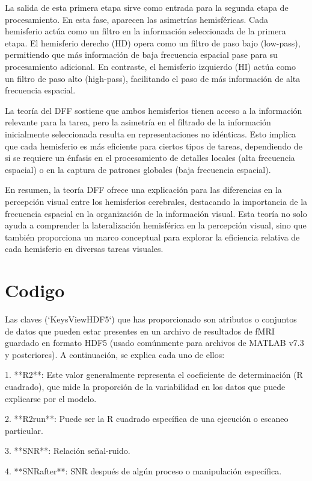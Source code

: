 \documentclass[12pt,oneside]{uhthesis}
\begin{document}
La salida de esta primera etapa sirve como entrada para la segunda etapa de procesamiento. En esta fase, aparecen las asimetrías hemisféricas. Cada hemisferio actúa como un filtro en la información seleccionada de la primera etapa. El hemisferio derecho (HD) opera como un filtro de paso bajo (low-pass), permitiendo que más información de baja frecuencia espacial pase para su procesamiento adicional. En contraste, el hemisferio izquierdo (HI) actúa como un filtro de paso alto (high-pass), facilitando el paso de más información de alta frecuencia espacial.

La teoría del DFF sostiene que ambos hemisferios tienen acceso a la información relevante para la tarea, pero la asimetría en el filtrado de la información inicialmente seleccionada resulta en representaciones no idénticas. Esto implica que cada hemisferio es más eficiente para ciertos tipos de tareas, dependiendo de si se requiere un énfasis en el procesamiento de detalles locales (alta frecuencia espacial) o en la captura de patrones globales (baja frecuencia espacial).

En resumen, la teoría DFF ofrece una explicación para las diferencias en la percepción visual entre los hemisferios cerebrales, destacando la importancia de la frecuencia espacial en la organización de la información visual. Esta teoría no solo ayuda a comprender la lateralización hemisférica en la percepción visual, sino que también proporciona un marco conceptual para explorar la eficiencia relativa de cada hemisferio en diversas tareas visuales.

\section{Codigo}

Las claves (`KeysViewHDF5`) que has proporcionado son atributos o conjuntos de datos que pueden estar presentes en un archivo de resultados de fMRI guardado en formato HDF5 (usado comúnmente para archivos de MATLAB v7.3 y posteriores). A continuación, se explica cada uno de ellos:

1. **R2**: Este valor generalmente representa el coeficiente de determinación (R cuadrado), que mide la proporción de la variabilidad en los datos que puede explicarse por el modelo.

2. **R2run**: Puede ser la R cuadrado específica de una ejecución o escaneo particular.

3. **SNR**: Relación señal-ruido.

4. **SNRafter**: SNR después de algún proceso o manipulación específica.
\end{document}
